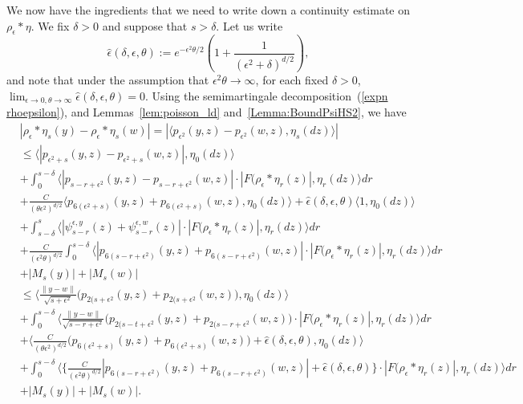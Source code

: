 \documentclass[12pt]{article}
\numberwithin{equation}{section}
\begin{document}
We now have the ingredients that we need to write down a continuity 
estimate on $\rho_\epsilon*\eta$.
We fix $\delta>0$ and 
suppose that $s>\delta$.
Let us write
\[
\widehat{\epsilon}(\delta,\epsilon,\theta):=
e^{-\epsilon^2\theta/2}\left(1+\frac{1}{(\epsilon^2+\delta)^{d/2}}\right),
\]
and note that under the assumption that $\epsilon^2\theta\to \infty$, for 
each fixed $\delta>0$,  
$\lim_{\epsilon\to 0, \theta\to\infty}
\widehat{\epsilon}(\delta,\epsilon,\theta)=0$. 
Using the semimartingale decomposition~(\ref{expn rhoepsilon}),
and Lemmas~\ref{lem:poisson_ld} and~\ref{Lemma:BoundPsiHS2},
we have
\begin{align}
& |\rho_\epsilon*\eta_s(y)-\rho_\epsilon*\eta_s(w)| \nonumber 
= |\langle p_{\epsilon^2}(y,z)-p_{\epsilon^2}(w,z),\eta_s(dz) \rangle | 
\nonumber
\\ 
&\leq 
\big\langle |p_{\epsilon^2+s}(y,z)-p_{\epsilon^2+s}(w,z)|, 
\eta_0(dz)\big\rangle 
\nonumber
	\\
	&+
\int_0^{s-\delta}
\big\langle |p_{s-r+\epsilon^2}(y,z)-p_{s-r+\epsilon^2}(w,z)| 
\cdot |F(\rho_\epsilon*\eta_r(z)|, 
\eta_r(dz) \big\rangle  dr
\nonumber
\\ 
	&+\frac{C}{(\theta\epsilon^2)^{d/2}}\big\langle 
p_{6(\epsilon^2+s)}(y,z)+p_{6(\epsilon^2+s)}(w,z), \eta_0(dz)
\big\rangle
	+\widehat{\epsilon}(\delta,\epsilon,\theta)\langle 1,\eta_0(dz)\rangle
	\nonumber
	\\
&+ \int_{s-\delta}^s \big\langle 
|\psi_{s-r}^{\epsilon,y}(z) + \psi_{s-r}^{\epsilon, w}(z) |
\cdot |F(\rho_\epsilon*\eta_r(z)|, 
\eta_r(dz) \big\rangle  dr
\nonumber
	\\ &+
\frac{C}{(\epsilon^2\theta)^{d/2}}
\int_0^{s-\delta}
\big\langle |p_{6(s-r+\epsilon^2)}(y,z)+
p_{6(s-r+\epsilon^2)}(w,z)|
\cdot |F(\rho_\epsilon*\eta_r(z)|, 
\eta_r(dz) \big\rangle  dr
\nonumber
\\
&
+|M_s(y)|+|M_s(w)| 
\nonumber
\\
&
\leq \Big\langle \frac{\|y-w\|}{\sqrt{s+\epsilon^2}}
\big(p_{2(s+\epsilon^2}(y,z)+p_{2(s+\epsilon^2}(w,z)\big),\eta_0(dz)\Big\rangle
\nonumber
\\
&+
\int_0^{s-\delta}\Big\langle\frac{\|y-w\|}{\sqrt{s-r+\epsilon^2}}
\big(p_{2(s-t+\epsilon^2}(y,z)+p_{2(s-r+\epsilon^2}(w,z)\big)
\cdot |F(\rho_\epsilon*\eta_r(z)|, 
\eta_r(dz)\Big\rangle dr
\nonumber
\\
&
	+\big\langle \frac{C}{(\theta\epsilon^2)^{d/2}}\Big( 
	p_{6(\epsilon^2+s)}(y,z)+p_{6(\epsilon^2+s)}(w,z)\Big)+
	\widehat{\epsilon}(\delta,\epsilon,\theta) , \eta_0(dz)
\big\rangle
\nonumber
\\
&+
\int_0^{s-\delta}
\big\langle \Big\{
\frac{C}{(\epsilon^2\theta)^{d/2}}
|p_{6(s-r+\epsilon^2)}(y,z)+
p_{6(s-r+\epsilon^2)}(w,z)| +\widehat{\epsilon}(\delta,\epsilon,\theta)\Big\}
\cdot |F(\rho_\epsilon*\eta_r(z)|, 
\eta_r(dz) \big\rangle  dr
\nonumber
\\
&
+|M_s(y)|+|M_s(w)|. 
\label{difference in rhos}
\end{align} 
\end{document}
